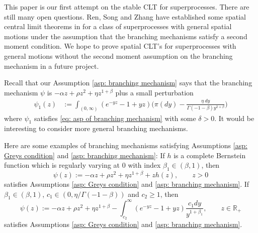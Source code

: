 \documentclass[12pt,a4paper]{amsart}
\theoremstyle{plain}
\theoremstyle{definition}
\numberwithin{equation}{section}
\begin{document}
This paper is our first attempt on the stable CLT for superprocesses.
There are still many open questions.
Ren, Song and Zhang have established some spatial  central limit theorems in \cite{RenSongZhang2015Central} for a class of superprocesses with general spatial motions under the assumption that the branching mechanisms satisfy a second moment condition.
We hope to prove spatial CLT's for superprocesses with general motions without the second moment assumption on the branching mechanism in a future project.

Recall that our Assumption \ref{asp: branching mechanism} says that the branching mechanism $\psi$ is $-\alpha z + \rho z^2+\eta z^{1+\beta}$ plus a small perturbation
\begin{align}
  \label{eq: psi 1}
	\psi_1(z)
	& := \int_{(0,\infty)}(e^{-yz}-1+yz) \Big(\pi(dy) - \frac{\eta~dy}{\Gamma(-1-\beta) y^{2+\beta}}\Big)
\end{align}
where $\psi_1$ satisfies \eqref{eq: asp of branching mechanism} with some $\delta>0$.
It would be interesting to consider more general branching mechanisms.

Here are some examples of branching mechanisms satisfying Assumptions \ref{asp: Greys condition} and \ref{asp: branching mechanism}:
If $h$ is a complete Bernstein function which is regularly varying at 0 with index $\beta_1\in (\beta, 1)$, then
\[
  \psi(z)
  := -\alpha z + \rho z^2+\eta z^{1+\beta}+zh(z)
  , \qquad z>0
\]
satisfies Assumptions \ref{asp: Greys condition} and \ref{asp: branching mechanism}.
If $\beta_1\in (\beta, 1)$, $c_1\in (0, \eta/\Gamma(-1-\beta))$ and $c_2\ge 1$, then
\[
  \psi(z)
  :=-\alpha z + \rho z^2+\eta z^{1+\beta}-\int^\infty_{c_2} (e^{-yz}-1+yz)\frac{c_1dy}{y^{1+\beta_1}}
  , \qquad z\in \mathbb R_+
\]
satisfies Assumptions \ref{asp: Greys condition} and \ref{asp: branching mechanism}.
\end{document}
